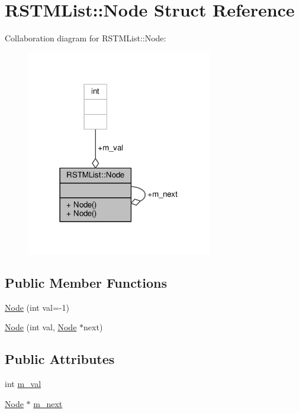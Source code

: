 \hypertarget{structRSTMList_1_1Node}{\section{R\-S\-T\-M\-List\-:\-:Node Struct Reference}
\label{structRSTMList_1_1Node}
}


Collaboration diagram for R\-S\-T\-M\-List\-:\-:Node\-:
\nopagebreak
\begin{figure}[H]
\begin{center}
\leavevmode
\includegraphics[width=230pt]{structRSTMList_1_1Node__coll__graph}
\end{center}
\end{figure}
\subsection*{Public Member Functions}
\begin{DoxyCompactItemize}
\item 
\hyperlink{structRSTMList_1_1Node_adb220f89425cad0052446eac89570002}{Node} (int val=-\/1)
\item 
\hyperlink{structRSTMList_1_1Node_aeb5defb2bde9e3e4b62c0b577d388805}{Node} (int val, \hyperlink{structRSTMList_1_1Node}{Node} $\ast$next)
\end{DoxyCompactItemize}
\subsection*{Public Attributes}
\begin{DoxyCompactItemize}
\item 
int \hyperlink{structRSTMList_1_1Node_ada6be80a230508db225adfe407456118}{m\-\_\-val}
\item 
\hyperlink{structRSTMList_1_1Node}{Node} $\ast$ \hyperlink{structRSTMList_1_1Node_a225bfe09b64cd569a4dc1c06a8e85c34}{m\-\_\-next}
\end{DoxyCompactItemize}


